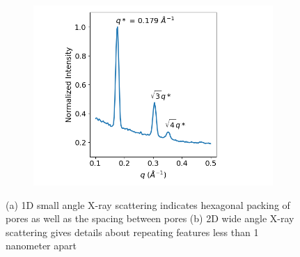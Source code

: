 \documentclass{article}
\begin{document}
  \begin{figure}
        \centering
        \begin{subfigure}[t]{0.43\linewidth}
                \centering
                \includegraphics[width=\linewidth]{SAXS.png}
                \caption{}\label{fig:SAXS}
        \end{subfigure}
        \begin{subfigure}[t]{0.47\linewidth}
                \centering
                \caption{}\label{fig:WAXS}
        \end{subfigure}
        \caption{(a) 1D small angle X-ray scattering indicates hexagonal packing of
        pores as well as the spacing between pores (b) 2D wide angle X-ray scattering
        gives details about repeating features less than 1 nanometer apart}\label{fig:SWAXS}
  \end{figure}
\end{document}
